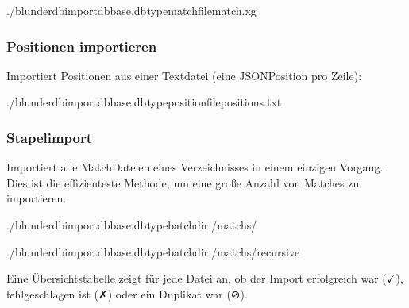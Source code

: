 \documentclass[letterpaper,10pt,german]{sphinxmanual}
\begin{document}
\begin{sphinxVerbatim}[commandchars=\\\{\}]
./blunderdbimport\PYGZhy{}\PYGZhy{}dbbase.db\PYGZhy{}\PYGZhy{}typematch\PYGZhy{}\PYGZhy{}filematch.xg
\end{sphinxVerbatim}


\subsubsection{Positionen importieren}
\label{\detokenize{cli:import-de-positions}}
\sphinxAtStartPar
Importiert Positionen aus einer Textdatei (eine JSON\sphinxhyphen{}Position pro Zeile):

\begin{sphinxVerbatim}[commandchars=\\\{\}]
./blunderdbimport\PYGZhy{}\PYGZhy{}dbbase.db\PYGZhy{}\PYGZhy{}typeposition\PYGZhy{}\PYGZhy{}filepositions.txt
\end{sphinxVerbatim}


\subsubsection{Stapelimport}
\label{\detokenize{cli:import-par-lot}}
\sphinxAtStartPar
Importiert alle Match\sphinxhyphen{}Dateien eines Verzeichnisses in einem einzigen Vorgang. Dies ist die effizienteste Methode, um eine große Anzahl von Matches zu importieren.

\begin{sphinxVerbatim}[commandchars=\\\{\}]
./blunderdbimport\PYGZhy{}\PYGZhy{}dbbase.db\PYGZhy{}\PYGZhy{}typebatch\PYGZhy{}\PYGZhy{}dir./matchs/

./blunderdbimport\PYGZhy{}\PYGZhy{}dbbase.db\PYGZhy{}\PYGZhy{}typebatch\PYGZhy{}\PYGZhy{}dir./matchs/\PYGZhy{}\PYGZhy{}recursive
\end{sphinxVerbatim}

\sphinxAtStartPar
Eine Übersichtstabelle zeigt für jede Datei an, ob der Import erfolgreich war (\(\checkmark\)), fehlgeschlagen ist (✗) oder ein Duplikat war (⊘).
\end{document}
